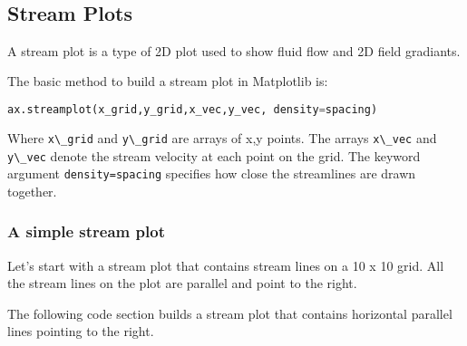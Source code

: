 \documentclass{book}
\newcommand{\passthrough}[1]{#1}
\begin{document}
    \begin{center}
    \end{center}
    { \hspace*{\fill} \\}
    

    
        \hypertarget{stream-plots}{%
\subsection{Stream Plots}\label{stream-plots}}
    




    
        A stream plot is a type of 2D plot used to show fluid flow and 2D field
gradiants.

The basic method to build a stream plot in Matplotlib is:

\begin{lstlisting}[language=Python]
ax.streamplot(x_grid,y_grid,x_vec,y_vec, density=spacing)
\end{lstlisting}

Where \passthrough{\lstinline!x\_grid!} and
\passthrough{\lstinline!y\_grid!} are arrays of x,y points. The arrays
\passthrough{\lstinline!x\_vec!} and \passthrough{\lstinline!y\_vec!}
denote the stream velocity at each point on the grid. The keyword
argument \passthrough{\lstinline!density=spacing!} specifies how close
the streamlines are drawn together.
    




    
        \hypertarget{a-simple-stream-plot}{%
\subsubsection{A simple stream plot}\label{a-simple-stream-plot}}

Let's start with a stream plot that contains stream lines on a 10 x 10
grid. All the stream lines on the plot are parallel and point to the
right.

The following code section builds a stream plot that contains horizontal
parallel lines pointing to the right.
    
\end{document}
